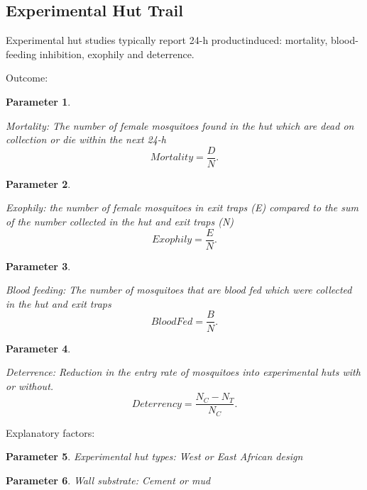 \documentclass[a4paper, 12pt, twoside]{article}
\newtheorem{parameter}{Parameter}
\begin{document}
\subsection{Experimental Hut Trail}

Experimental hut studies typically report 24-h productinduced: mortality, blood-feeding inhibition, exophily and deterrence.

Outcome:

\begin{parameter}
  \label{eht:mortality} 

  Mortality: The number of female mosquitoes found in the hut which are dead on collection or die within the next 24-h
  \[
  Mortality = \frac{D}{N}
  .\] 
\end{parameter}


\begin{parameter}
  \label{eht:exophily} 

  Exophily: the number of female mosquitoes in exit traps (E) compared to the sum of the number collected in the hut and exit traps (N)
  \[
  Exophily = \frac{E}{N}
  .\] 

\end{parameter}

\begin{parameter}
  \label{eht:blood_fed} 

  Blood feeding: The number of mosquitoes that are blood fed which were collected in the hut and exit traps
  \[
  BloodFed = \frac{B}{N}
  .\] 
\end{parameter}

\begin{parameter}
  \label{eht:Deterrence} 

  Deterrence: Reduction in the entry rate of mosquitoes into experimental huts with or without.
  \[
    Deterrency = \frac{N_C - N_T}{N_C}
  .\] 
\end{parameter}

Explanatory factors:

\begin{parameter}
  \label{eht:experimental_hut_types}
  Experimental hut types: West or East African design
  
\end{parameter}

\begin{parameter}
\label{eht:wall_substrate}
  Wall substrate: Cement or mud
  
\end{parameter}
\end{document}
